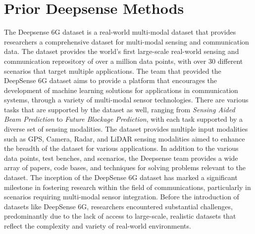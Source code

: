 \section{Prior Deepsense Methods}
The Deepsense 6G dataset is a real-world multi-modal dataset that provides researchers a comprehensive dataset for multi-modal sensing and communication data. The dataset provides the world's first large-scale real-world sensing and communication reprository of over a million data points, with over 30 different scenarios that target multiple applications. The team that provided the DeepSense 6G dataset aims to provide a platform that encourages the development of machine learning solutions for applications in communication systems, through a variety of multi-modal sensor technologies. There are various tasks that are supported by the dataset as well, ranging from \textit{Sensing Aided Beam Prediction} to \textit{Future Blockage Prediction}, with each task supported by a diverse set of sensing modalities. The dataset provides multiple input modalities such as GPS, Camera, Radar, and LiDAR sensing modalities aimed to enhance the breadth of the dataset for various applications. In addition to the various data points, test benches, and scenarios, the Deepsense team provides a wide array of papers, code bases, and techniques for solving problems relevant to the dataset. The inception of the DeepSense 6G dataset has marked a significant milestone in fostering research within the field of communications, particularly in scenarios requiring multi-modal sensor integration. Before the introduction of datasets like DeepSense 6G, researchers encountered substantial challenges, predominantly due to the lack of access to large-scale, realistic datasets that reflect the complexity and variety of real-world environments. \cite{alkhateeb2023deepsense}

